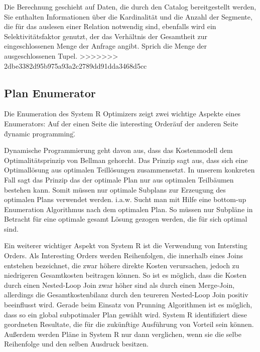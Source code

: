 Die Berechnung geschieht auf Daten, die durch den Catalog bereitgestellt werden, Sie enthalten Informationen über die Kardinalität und die Anzahl der Segmente, die für das auslesen einer Relation notwendig sind, ebenfalls wird ein Selektivitätsfaktor genutzt, der das Verhältnis der Gesamtheit zur eingeschlossenen Menge der Anfrage angibt. Sprich die Menge der ausgeschlossenen Tupel.
>>>>>>> 2dbe3382d95b975a93a2c2789dd91dda3468d5cc

\subsection{Plan Enumerator}
Die Enumeration des System R Optimizers zeigt zwei wichtige Aspekte eines Enumerators: Auf der einen Seite die \"interesting Order\" auf der anderen Seite \"dynamic programming\". 

Dynamische Programmierung geht davon aus, dass das Kostenmodell dem Optimalitätsprinzip von Bellman \cite{Bellman:1957} gehorcht. Das Prinzip sagt aus, dass sich eine Optimallösung aus optimalen Teillösungen zusammensetzt. In unserem konkreten Fall sagt das Prinzip das der optimale Plan nur aus optimalen Teilbäumen bestehen kann. Somit müssen nur optimale Subplans zur Erzeugung des optimalen Plans verwendet werden. i.a.w. Sucht man mit Hilfe eine bottom-up Enumeration Algorithmus nach dem optimalen Plan. So müssen nur Subpläne in Betracht für eine optimale gesamt Lösung gezogen werden, die für sich optimal sind. 

Ein weiterer wichtiger Aspekt von System R ist die Verwendung von Intersting Orders. Als Interesting Orders werden Reihenfolgen, die innerhalb eines Joins entstehen bezeichnet, die zwar höhere direkte Kosten verursachen, jedoch zu niedrigeren Gesamtkosten beitragen können. So ist es möglich, dass die Kosten durch einen Nested-Loop Join zwar höher sind als durch einen Merge-Join, allerdings die Gesamtkostenbilanz durch den teureren Nested-Loop Join positiv beeinflusst wird. Gerade beim Einsatz von Prunning Algorithmen ist es möglich, dass so ein global subpotimaler Plan gewählt wird. System R identifiziert diese geordneten Resultate, die für die zukünftige Ausführung von Vorteil sein können. Außerdem werden Pläne in System R nur dann verglichen, wenn sie die selbe Reihenfolge und den selben Ausdruck besitzen. 